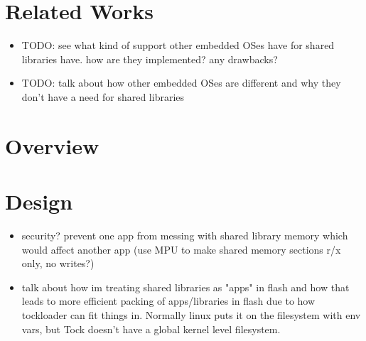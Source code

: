 \documentclass{article}
\begin{document}
\section*{Related Works}

\begin{itemize}
    \item TODO: see what kind of support other embedded OSes have for shared libraries have. how are they implemented? any drawbacks?
    \item TODO: talk about how other embedded OSes are different and why they don't have a need for shared libraries 
\end{itemize}

\section*{Overview}

\section*{Design}

\begin{itemize}
    \item security? prevent one app from messing with shared library memory which would affect another app (use MPU to make shared memory sections r/x only, no writes?)
    \item talk about how im treating shared libraries as "apps" in flash and how that leads to more efficient packing of apps/libraries in flash due to how tockloader can fit things in. Normally linux puts it on the filesystem with env vars, but Tock doesn't have a global kernel level filesystem.
\end{itemize}
\end{document}
